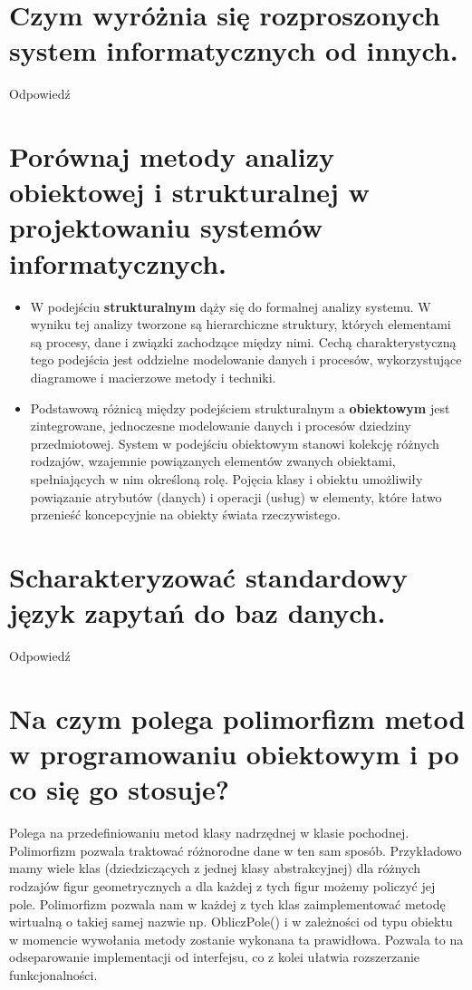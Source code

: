 \documentclass[12pt,a4paper]{article}
\begin{document}
	\section{Czym wyróżnia się rozproszonych system informatycznych od innych.}
	Odpowiedź

	\section{Porównaj metody analizy obiektowej i strukturalnej w projektowaniu systemów informatycznych.}
	\begin{itemize}
		\item W podejściu \textbf{strukturalnym} dąży się do formalnej analizy systemu. W wyniku tej analizy tworzone są hierarchiczne struktury, których elementami są procesy, dane i związki zachodzące między nimi. Cechą charakterystyczną tego podejścia jest oddzielne modelowanie danych i procesów, wykorzystujące diagramowe i macierzowe metody i techniki.
		\item Podstawową różnicą między podejściem strukturalnym a \textbf{obiektowym} jest zintegrowane, jednoczesne modelowanie danych i procesów dziedziny przedmiotowej. System w podejściu obiektowym stanowi kolekcję różnych rodzajów, wzajemnie powiązanych elementów zwanych obiektami, spełniających w nim określoną rolę. Pojęcia klasy i obiektu umożliwiły powiązanie atrybutów (danych) i operacji (usług) w elementy, które łatwo przenieść koncepcyjnie na obiekty świata rzeczywistego.
	\end{itemize}

	\section{Scharakteryzować standardowy język zapytań do baz danych.}
	Odpowiedź

	\section{Na czym polega polimorfizm metod w programowaniu obiektowym i po co się go stosuje?}
	Polega na przedefiniowaniu metod klasy nadrzędnej w klasie pochodnej. Polimorfizm pozwala traktować różnorodne dane w ten sam sposób. Przykładowo mamy wiele klas (dziedziczących z jednej klasy abstrakcyjnej) dla różnych rodzajów figur geometrycznych a dla każdej z tych figur możemy policzyć jej pole. Polimorfizm pozwala nam w każdej z tych klas zaimplementować metodę wirtualną o takiej samej nazwie np. ObliczPole() i w zależności od typu obiektu w momencie wywołania metody zostanie wykonana ta prawidłowa. Pozwala to na odseparowanie implementacji od interfejsu, co z kolei ułatwia rozszerzanie funkcjonalności.
\end{document}
